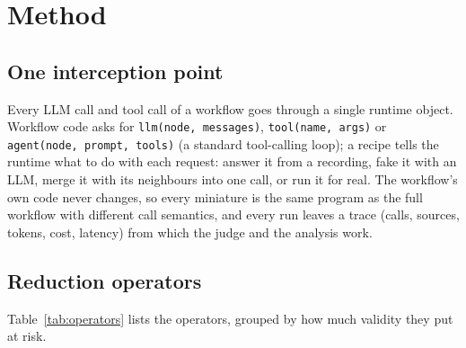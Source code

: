 \section{Method}
\label{sec:method}

\subsection{One interception point}
Every LLM call and tool call of a workflow goes through a single runtime object. Workflow code asks
for \texttt{llm(node, messages)}, \texttt{tool(name, args)} or \texttt{agent(node, prompt, tools)}
(a standard tool-calling loop); a recipe tells the runtime what to do with each request: answer it
from a recording, fake it with an LLM, merge it with its neighbours into one call, or run it for
real. The workflow's own code never changes, so every miniature is the same program as the full
workflow with different call semantics, and every run leaves a trace (calls, sources, tokens,
cost, latency) from which the judge and the analysis work.

\subsection{Reduction operators}
Table~\ref{tab:operators} lists the operators, grouped by how much validity they put at risk.

